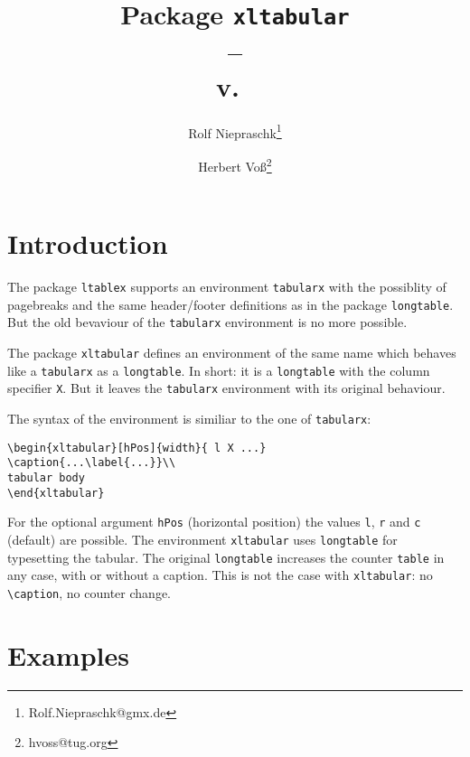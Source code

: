 \documentclass[paper=a4,fontsize=11pt,DIV=13,parskip=half-,
               captions=tableabove,twoside=on]{scrartcl}
\title{Package \texttt{xltabular} \\--\\ v.~\XLVersion}
\author{Rolf Niepraschk\thanks{Rolf.Niepraschk@gmx.de} \and Herbert Voß\thanks{hvoss@tug.org}}
\newcommand*\cs[1]{\texttt{\textbackslash#1}}
\begin{document}
\maketitle
\tableofcontents

\section{Introduction}

The package \texttt{ltablex} supports an environment \texttt{tabularx} with 
the possiblity of pagebreaks and the same header/footer definitions as in
the package \texttt{longtable}. But the old bevaviour of the \texttt{tabularx}
environment is no more possible.

The package \texttt{xltabular} defines an environment of the same name
which behaves like a \texttt{tabularx} as a \texttt{longtable}. In short:
it is a \texttt{longtable} with the column specifier \texttt{X}. But it leaves the 
\texttt{tabularx} environment with its original behaviour. 

The syntax of the environment is similiar to the one of \texttt{tabularx}:

\begin{verbatim}
\begin{xltabular}[hPos]{width}{ l X ...}
\caption{...\label{...}}\\
tabular body
\end{xltabular}
\end{verbatim}

For the optional argument \texttt{hPos} (horizontal position) the values \texttt{l}, 
\texttt{r} and \texttt{c} (default)
are possible. The environment \texttt{xltabular} uses \texttt{longtable} for
typesetting the tabular. The original \texttt{longtable} increases the counter
\texttt{table} in any case, with or without a caption. This is not the case
with \texttt{xltabular}: no \cs{caption}, no counter change.




\section{Examples}

\newcommand\B{Some nonsense text which fills at least one line
	of a tabular called nonsense tabular with text.\\}
\newcommand\BB{\B\B\B\B\B\B\B\B\B\B\B\B\B\B\B}
\newcommand\BBB{\BB\BB\BB\BB}

\listoftables
\end{document}
